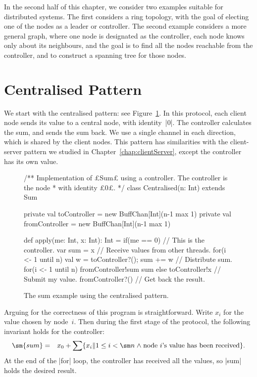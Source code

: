 In the second half of this chapter, we consider two examples suitable for
distributed systems.  The first considers a ring topology, with the goal of
electing one of the nodes as a leader or controller.  The second example
considers a more general graph, where one node is designated as the
controller, each node knows only about its neighbours, and the goal is to find
all the nodes reachable from the controller, and to construct a spanning tree
for those nodes.



\section{Centralised Pattern}

We start with the centralised pattern: see Figure~\ref{fig:sum-centralised}.
In this protocol, each client node sends its value to a central node, with
identity~|0|.  The controller calculates the sum, and sends the sum back.
We use a single channel in each direction, which is shared by the client
nodes.  This pattern has similarities with the client-server pattern we
studied in Chapter~\ref{chap:clientServer}, except the controller has its own
value. 


\begin{figure}[bht]
\begin{scala}
/** Implementation of £Sum£ using a controller.  The controller is the node
  * with identity £0£. */
class Centralised(n: Int) extends Sum{
  private val toController = new BuffChan[Int](n-1 max 1)
  private val fromController = new BuffChan[Int](n-1 max 1)

  def apply(me: Int, x: Int): Int = {
    if(me == 0){ // This is the controller.
      var sum = x
      // Receive values from other threads.
      for(i <- 1 until n){ val w = toController?(); sum += w }
      // Distribute sum.
      for(i <- 1 until n) fromController!sum
      sum
    }
    else{
      toController!x     // Submit my value.
      fromController?() // Get back the result.
    }
  }
}
\end{scala}
\caption{The sum example using the centralised pattern.}
\label{fig:sum-centralised}
\end{figure}


Arguing for the correctness of this program is straightforward.
Write $x_i$ for the value chosen by node~$i$.  Then during the first stage of
the protocol, the following invariant holds for the controller:
%
\begin{eqnarray*}
\sm{sum} & = & 
   x_0 + \sum \set{x_i \| 1 \le i < \sm n \land 
           \mbox{node~$i$'s value has been received}}.
\end{eqnarray*}
%
At the end of the |for| loop, the controller has received all the values, so
|sum| holds the desired result. 

